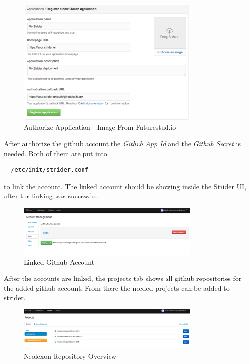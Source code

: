 \begin{figure}[h!]
  \centering
  \includegraphics[width=0.8\textwidth]{images/auth_app.png}
  \caption{Authorize Application - Image From Futurestud.io}
\end{figure}

After authorize the github account the \textit{Github App Id} and the \textit{Github Secret} is needed. Both of them are put
into

\begin{lstlisting}
  /etc/init/strider.conf
\end{lstlisting}

to link the account. The linked account should be showing inside the Strider UI, after the linking was successful.

\begin{figure}[h!]
  \centering
  \includegraphics[width=0.8\textwidth]{images/linkedGithub.png}
  \caption{Linked Github Account}
\end{figure}

After the accounts are linked, the projects tab shows all github repositories for the added github account. From there the needed projects can
be added to strider.

\begin{figure}[h!]
  \centering
  \includegraphics[width=0.8\textwidth]{images/neolexonGit.png}
  \caption{Neolexon Repository Overview}
\end{figure}


